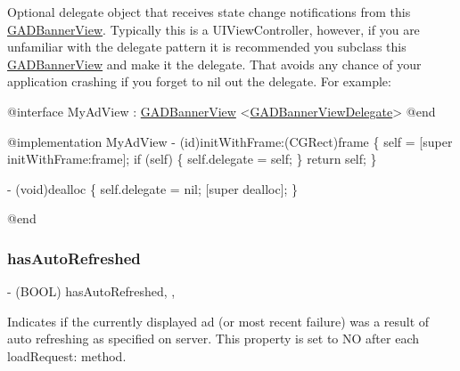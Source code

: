 Optional delegate object that receives state change notifications from this \hyperlink{interfaceGADBannerView}{G\+A\+D\+Banner\+View}. Typically this is a U\+I\+View\+Controller, however, if you are unfamiliar with the delegate pattern it is recommended you subclass this \hyperlink{interfaceGADBannerView}{G\+A\+D\+Banner\+View} and make it the delegate. That avoids any chance of your application crashing if you forget to nil out the delegate. For example\+:


\begin{DoxyCode}
\textcolor{keyword}{@interface }MyAdView : \hyperlink{interfaceGADBannerView}{GADBannerView} <\hyperlink{protocolGADBannerViewDelegate-p}{GADBannerViewDelegate}>
\textcolor{keyword}{@end}

\textcolor{keyword}{@implementation }MyAdView
- (id)initWithFrame:(CGRect)frame \{
  \textcolor{keyword}{self} = [\textcolor{keyword}{super} initWithFrame:frame];
  \textcolor{keywordflow}{if} (\textcolor{keyword}{self}) \{
    \textcolor{keyword}{self}.delegate = \textcolor{keyword}{self};
  \}
  \textcolor{keywordflow}{return} \textcolor{keyword}{self};
\}

- (void)dealloc \{
  \textcolor{keyword}{self}.delegate = nil;
  [\textcolor{keyword}{super} dealloc];
\}

\textcolor{keyword}{@end}
\end{DoxyCode}
 \mbox{\label{interfaceGADBannerView_a3f3b070d051daa56c1d60709ee5eeaab}} 
\subsubsection{\texorpdfstring{has\+Auto\+Refreshed}{hasAutoRefreshed}}
{\footnotesize\ttfamily -\/ (B\+O\+OL) has\+Auto\+Refreshed\hspace{0.3cm}{\ttfamily [read]}, {\ttfamily [nonatomic]}, {\ttfamily [assign]}}

Indicates if the currently displayed ad (or most recent failure) was a result of auto refreshing as specified on server. This property is set to NO after each load\+Request\+: method. \mbox{\label{interfaceGADBannerView_a3570b23f24955977ad690b01bdb3279b}} 
